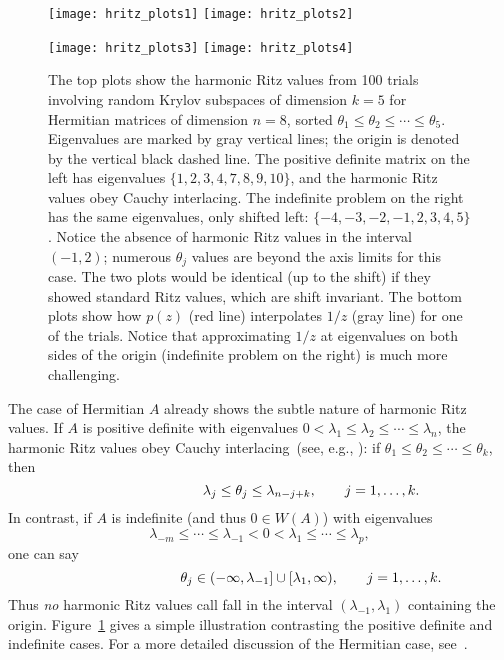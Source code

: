 \documentclass{siamart}
\begin{document}
\begin{figure}[t!]
\begin{center}
\texttt{[image: hritz\_plots1]}\quad
\texttt{[image: hritz\_plots2]}

\vspace*{3pt}
\hspace*{2pt}
\texttt{[image: hritz\_plots3]}\hspace{9pt}
\texttt{[image: hritz\_plots4]}
\end{center}

\vspace{-6pt}
\caption{\label{fig:hritz_plots}
The top plots show the harmonic Ritz values from 100 trials involving random Krylov subspaces of dimension $k=5$ for Hermitian matrices of dimension $n=8$, sorted $\theta_1 \le \theta_2 \le \cdots \le \theta_5$.  Eigenvalues are marked by gray vertical lines; the origin is denoted by the vertical black dashed line.  The positive definite matrix on the left has eigenvalues $\{1,2,3,4,7,8,9,10\}$, and the harmonic Ritz values obey Cauchy interlacing.  The indefinite problem on the right has the same eigenvalues, only shifted left: $\{-4,-3,-2,-1, 2,3,4,5\}$.  Notice the absence of harmonic Ritz values in the interval $(-1,2)$; numerous $\theta_j$ values are beyond the axis limits for this case. The two plots would be identical (up to the shift) if they showed standard Ritz values, which are shift invariant.  The bottom plots show how $p(z)$ (red line) interpolates $1/z$ (gray line) for one of the trials.  Notice that approximating $1/z$ at eigenvalues on both sides of the origin (indefinite problem on the right) is much more challenging.}
\end{figure}


The case of Hermitian $A$ already shows the subtle nature of harmonic Ritz values.  If $A$ is positive definite with eigenvalues $0 < \lambda_1 \le \lambda_2 \le \cdots \le \lambda_n$,  the harmonic Ritz values obey Cauchy interlacing~(see, e.g., \cite{Par98}):  
if $\theta_1 \le \theta_2 \le \cdots \le \theta_k$, then 
\[ \lambda_j \le \theta_j \le \lambda_{n-j+k}, \rlap{\qquad $j=1,\ldots,k$.}\]
In contrast, if $A$ is indefinite (and thus $0 \in W(A)$) with eigenvalues
\[ \lambda_{-m} \le \cdots \le \lambda_{-1} < 0 < \lambda_1 \le \cdots \le \lambda_p,\]
one can say
\[ \theta_j \in (-\infty, \lambda_{-1}] \cup [\lambda_1,\infty), \rlap{\qquad $j=1,\ldots, k$.} \]
Thus \emph{no} harmonic Ritz values call fall in the interval $(\lambda_{-1},\lambda_1)$ containing the origin.
Figure~\ref{fig:hritz_plots} gives a simple illustration contrasting the positive definite and indefinite cases.
For a more detailed discussion of the Hermitian case, see~\cite{Bea98}.
\end{document}
